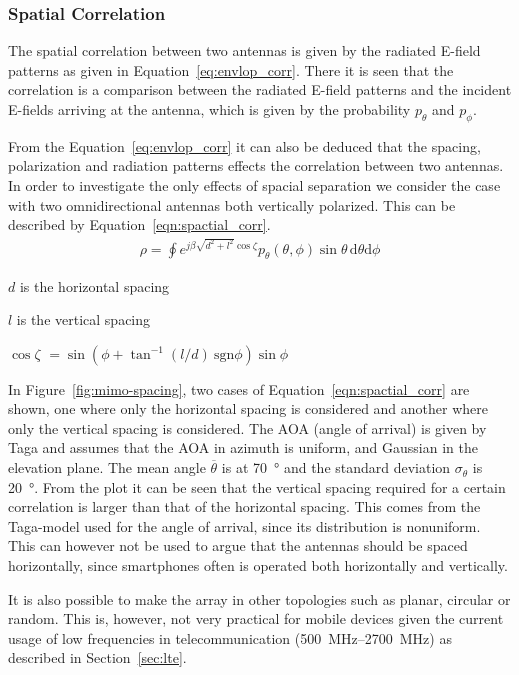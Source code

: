 \subsubsection{Spatial Correlation}
The spatial correlation between two antennas is given by the radiated E-field patterns as given in Equation~\ref{eq:envlop_corr}. There it is seen that the correlation is a comparison between the radiated E-field patterns and the incident E-fields arriving at the antenna, which is given by the probability $p_\theta$ and $p_\phi$. 

From the Equation~\ref{eq:envlop_corr} it can also be deduced that the spacing, polarization and radiation patterns effects the correlation between two antennas. In order to investigate the only effects of spacial separation we consider the case with two omnidirectional antennas both vertically polarized. This can be described by Equation~\ref{eqn:spactial_corr}\cite{Tim2012Practical}.
\begin{align}
\label{eqn:spactial_corr}
  \rho = \oint e^{j\beta \sqrt{d^2+l^2}\cos\zeta}p_\theta(\theta,\phi)\sin\theta \, \mathrm{d} \theta \mathrm{d} \phi
\end{align}
\begin{where}
\item[$d$] is the horizontal spacing
\item[$l$] is the vertical spacing
\item[$\cos \zeta$] $= \sin(\phi + \tan^{-1}(l/d)\ \text{sgn}\phi)\sin\phi$   
\end{where}

In Figure~\ref{fig:mimo-spacing}, two cases of Equation~\ref{eqn:spactial_corr} are shown, one where only the horizontal spacing is considered and another where only the vertical spacing is considered. The AOA (angle of arrival) is given by Taga and assumes that the AOA in azimuth is uniform, and Gaussian in the elevation plane. The mean angle $\overline{\theta}$ is at \SI{70}{\degree} and the standard deviation $\sigma_\theta$ is \SI{20}{\degree}. From the plot it can be seen that the vertical spacing required for a certain correlation is larger than that of the horizontal spacing. This comes from the Taga-model used for the angle of arrival, since its distribution is nonuniform. This can however not be used to argue that the antennas should be spaced horizontally, since smartphones often is operated both horizontally and vertically\cite{Tim2012Practical}. 

It is also possible to make the array in other topologies such as planar, circular or random. This is, however, not very practical for mobile devices given the current usage of low frequencies in telecommunication (\SIrange{500}{2700}{MHz}) as described in Section~\ref{sec:lte}.

